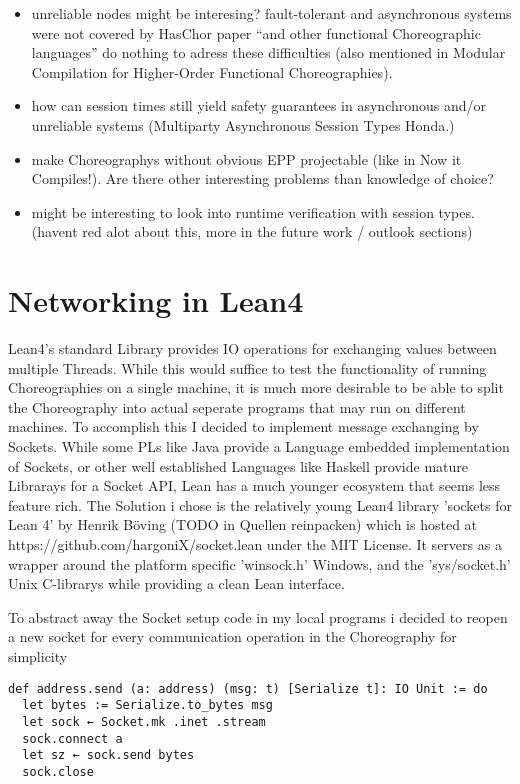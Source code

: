 \documentclass[
	ngerman,
	ruledheaders=section,%
	class=report,%
	thesis={type=master},%
	accentcolor=9c,%
	custommargins=true,%
	marginpar=false,%
	parskip=half-,%
	fontsize=11pt,%
]{tudapub}
\begin{document}
\begin{itemize}
  \item unreliable nodes might be interesing? fault-tolerant and asynchronous systems were not covered by HasChor paper ``and other functional Choreographic languages'' do nothing to adress these difficulties (also mentioned in Modular Compilation for Higher-Order Functional Choreographies).
  \item how can session times still yield safety guarantees in asynchronous and/or unreliable systems (Multiparty Asynchronous Session Types Honda.)
  \item make Choreographys without obvious EPP projectable (like in Now it Compiles!). Are there other interesting problems than knowledge of choice?
  \item might be interesting to look into runtime verification with session types. (havent red alot about this, more in the future work / outlook sections)
\end{itemize}

\chapter{Networking in Lean4}
Lean4's standard Library provides IO operations for exchanging values between multiple Threads. While this would suffice to test the functionality of running Choreographies on a single machine, it is much more desirable to be able to split the Choreography into actual seperate programs that may run on different machines. To accomplish this I decided to implement message exchanging by Sockets.
While some PLs like Java provide a Language embedded implementation of Sockets, or other well established Languages like Haskell provide mature Librarays for a Socket API, Lean has a much younger ecosystem that seems less feature rich. The Solution i chose is the relatively young Lean4 library 'sockets for Lean 4' by Henrik Böving (TODO in Quellen reinpacken) which is hosted at https://github.com/hargoniX/socket.lean under the MIT License. It servers as a wrapper around the platform specific 'winsock.h' Windows, and the 'sys/socket.h' Unix C-librarys while providing a clean Lean interface.
\par
To abstract away the Socket setup code in my local programs i decided to reopen a new socket for every communication operation in the Choreography for simplicity

\begin{lstlisting}[language=lean]
def address.send (a: address) (msg: t) [Serialize t]: IO Unit := do
  let bytes := Serialize.to_bytes msg
  let sock ← Socket.mk .inet .stream
  sock.connect a
  let sz ← sock.send bytes
  sock.close
\end{lstlisting}
\end{document}
